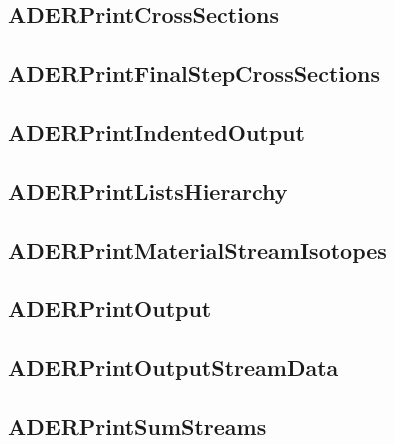 \subsection{ADERPrintCrossSections}


\subsection{ADERPrintFinalStepCrossSections}


\subsection{ADERPrintIndentedOutput}


\subsection{ADERPrintListsHierarchy}


\subsection{ADERPrintMaterialStreamIsotopes}


\subsection{ADERPrintOutput}


\subsection{ADERPrintOutputStreamData}


\subsection{ADERPrintSumStreams}


